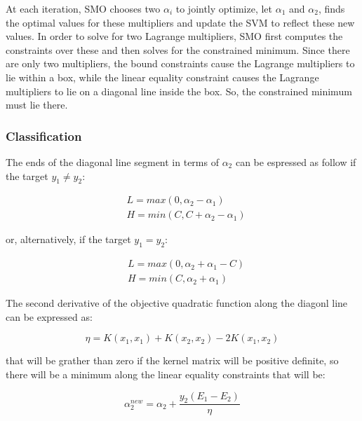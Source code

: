 At each iteration, SMO chooses two $\alpha_i$ to jointly optimize, let $\alpha_1$ and $\alpha_2$, finds the optimal values for these multipliers and update the SVM to reflect these new values. In order to solve for two Lagrange multipliers, SMO first computes the constraints over these and then solves for the constrained minimum. Since there are only two multipliers, the bound constraints cause the Lagrange multipliers to lie within a box, while the linear equality constraint causes the Lagrange multipliers to lie on a diagonal line inside the box. So, the constrained minimum must lie there.

\subsubsection{Classification}

The ends of the diagonal line segment in terms of $\alpha_2$ can be espressed as follow if the target $y_1 \ne y_2$:

\begin{equation} \label{eq:bounds_update1}
	\begin{aligned}
		& L = max(0, \alpha_2 - \alpha_1) \\
		& H = min(C, C + \alpha_2 - \alpha_1)
	\end{aligned}
\end{equation}

or, alternatively, if the target $y_1 = y_2$:

\begin{equation} \label{eq:bounds_update2}
	\begin{aligned}
		& L = max(0, \alpha_2 + \alpha_1 - C) \\
		& H = min(C, \alpha_2 + \alpha_1)
	\end{aligned}
\end{equation}

The second derivative of the objective quadratic function along the diagonl line can be expressed as:

\begin{equation} \label{eq:smo_eta}
\eta = K(x_1, x_1) + K(x_2, x_2) - 2K(x_1, x_2)
\end{equation}

that will be grather than zero if the kernel matrix will be positive definite, so there will be a minimum along the linear equality constraints that will be:

\begin{equation} \label{eq:smo_a_2_new}
	\alpha_2^{new} = \alpha_2 + \frac{y_2(E_1 - E_2)}{\eta}
\end{equation}

